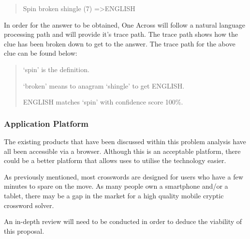 \begin{quote}
Spin broken shingle (7) =\textgreater  ENGLISH
\end{quote}

In order for the answer to be obtained, One Across will follow a natural 
language processing path and will provide it’s trace path. The trace path shows
how the clue has been broken down to get to the answer. The trace path for the 
above clue can be found below:

\begin{quote}
`spin' is the definition.

`broken' means to anagram `shingle' to get ENGLISH.

ENGLISH matches `spin' with confidence score 100\%.
\end{quote}

\subsubsection{Application Platform}

The existing products that have been discussed within this problem analysis 
have all been accessible via a browser. Although this is an acceptable 
platform, there could be a better platform that allows uses to utilise the 
technology easier.

As previously mentioned, most crosswords are designed for users who have a few 
minutes to spare on the move. As many people own a smartphone and/or a tablet, 
there may be a gap in the market for a high quality mobile cryptic crossword 
solver.

An in-depth review will need to be conducted in order to deduce the viability 
of this proposal.
